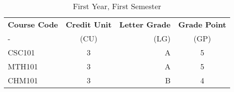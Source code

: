 \documentclass{article}
\begin{document}
	\begin{table}[h!]
		\begin{center}
			\caption{First Year, First Semester}
			\label{tab:table1}
			\begin{tabular}{l|c|r|c}
				\textbf{Course Code} & \textbf{Credit Unit} & \textbf{Letter Grade} & \textbf{Grade Point}\\
				- & (CU) & (LG) & (GP)\\
				\hline
				CSC101 & 3 & A & 5\\
				MTH101 & 3 & A & 5\\
				CHM101 & 3 & B & 4\\
				
			\end{tabular}
		\end{center}
	\end{table}
\end{document}

